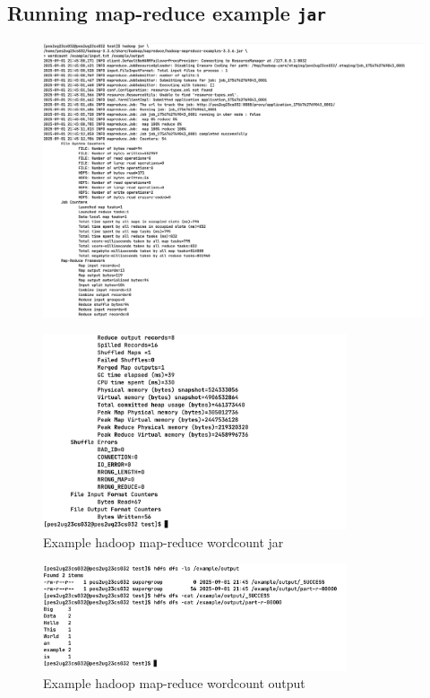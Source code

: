 \documentclass[12pt,a4paper]{article}
\begin{document}
\subsection{Running map-reduce example \texttt{jar}}
\begin{figure}[H]
    \centering
    \includegraphics[width=\textwidth]{./images/img3.png}
\end{figure}

\begin{figure}[H]
    \centering
    \includegraphics[width=0.8\textwidth]{./images/img3b.png}
    \caption{Example hadoop map-reduce wordcount jar}
\end{figure}

\begin{figure}[H]
   \centering
   \includegraphics[width=0.8\textwidth]{./images/img4.png} 
   \caption{Example hadoop map-reduce wordcount output}
\end{figure}
\end{document}
